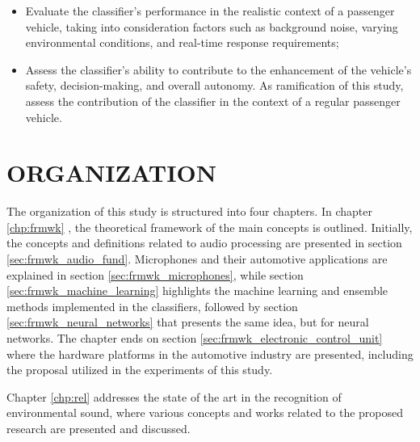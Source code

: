 \begin{itemize}
\begin{itemize}
        \item Evaluate the classifier's performance in the realistic context of a passenger vehicle, taking into consideration factors such as background noise, varying environmental conditions, and real-time response requirements;
        \item Assess the classifier's ability to contribute to the enhancement of the vehicle's safety, decision-making, and overall autonomy. As ramification of this study, assess the contribution of the classifier in the context of a regular passenger vehicle.
    \end{itemize}
\end{itemize}


\section{ORGANIZATION}
\label{sec:introduction_organization}

The organization of this study is structured into four chapters. In chapter \ref{chp:frmwk} , the theoretical framework of the main concepts is outlined. Initially, the concepts and definitions related to audio processing are presented in section \ref{sec:frmwk_audio_fund}. Microphones and their automotive applications are explained in section \ref{sec:frmwk_microphones}, while section \ref{sec:frmwk_machine_learning} highlights the machine learning and ensemble methods implemented in the classifiers, followed by section \ref{sec:frmwk_neural_networks} that presents the same idea, but for neural networks. %
The chapter ends on section \ref{sec:frmwk_electronic_control_unit} where the hardware platforms in the automotive industry are presented, including the proposal utilized in the experiments of this study.

Chapter \ref{chp:rel} addresses the state of the art in the recognition of environmental sound, where various concepts and works related to the proposed research are presented and discussed.

